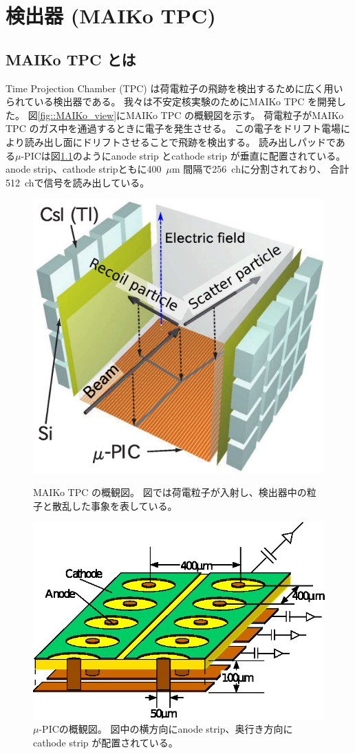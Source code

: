 \chapter{検出器 (MAIKo TPC)}
\section{MAIKo TPC とは}
Time Projection Chamber (TPC) は荷電粒子の飛跡を検出するために広く用いられている検出器である。
我々は不安定核実験のためにMAIKo TPC を開発した。
図\ref{fig::MAIKo_view}にMAIKo TPC の概観図を示す。
荷電粒子がMAIKo TPC のガス中を通過するときに電子を発生させる。
この電子をドリフト電場により読み出し面にドリフトさせることで飛跡を検出する。
読み出しパッドである$\mu$-PICは図\ref{fig::mupic}のようにanode strip とcathode strip が垂直に配置されている。
anode strip、cathode stripともに400~$\mu$m 間隔で256~chに分割されており、
合計512~chで信号を読み出している。
\begin{figure}
  \centering
  \includegraphics[clip, width=0.7\columnwidth]{eps/at_fig2.eps}
  \caption[MAIKo TPC の概観図。]{MAIKo TPC の概観図。
    図では荷電粒子が入射し、検出器中の粒子と散乱した事象を表している。
  }
  \label{fig::MAIKo_view}
  \includegraphics[clip, width=0.7\columnwidth]{eps/upic_struc.eps}
  \caption[$\mu$-PICの概観図。]{$\mu$-PICの概観図。
    図中の横方向にanode strip、奥行き方向にcathode strip が配置されている。
  }
  \label{fig::mupic}
\end{figure}
